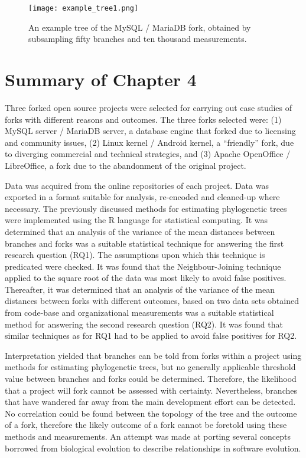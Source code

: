 \begin{figure}[H]
  \texttt{[image: example\_tree1.png]}
  \caption{An example tree of the MySQL / MariaDB fork, obtained by subsampling fifty branches and ten thousand measurements.}
  \label{fig:example_tree1}
\end{figure}


\section{Summary of Chapter 4}
Three forked open source projects were selected for carrying out case studies of forks with different reasons and outcomes. The three forks selected were: (1) MySQL server / MariaDB server, a database engine that forked due to licensing and community issues, (2) Linux kernel / Android kernel, a “friendly” fork, due to diverging commercial and technical strategies, and (3) Apache OpenOffice / LibreOffice, a fork due to the abandonment of the original project. 

Data was acquired from the online repositories of each project. Data was exported in a format suitable for analysis, re-encoded and cleaned-up where necessary. The previously discussed methods for estimating phylogenetic trees were implemented using the R language for statistical computing. It was determined that an analysis of the variance of the mean distances between branches and forks was a suitable statistical technique for answering the first research question (RQ1). The assumptions upon which this technique is predicated were checked. It was found that the Neighbour-Joining technique applied to the square root of the data was most likely to avoid false positives. Thereafter, it was determined that an analysis of the variance of the mean distances between forks with different outcomes, based on two data sets obtained from code-base and organizational measurements was a suitable statistical method for answering the second research question (RQ2). It was found that similar techniques as for RQ1 had to be applied to avoid false positives for RQ2. 

Interpretation yielded that branches can be told from forks within a project using methods for estimating phylogenetic trees, but no generally applicable threshold value between branches and forks could be determined. Therefore, the likelihood that a project will fork cannot be assessed with certainty. Nevertheless, branches that have wandered far away from the main development effort can be detected. No correlation could be found between the topology of the tree and the outcome of a fork, therefore the likely outcome of a fork cannot be foretold using these methods and measurements. An attempt was made at porting several concepts borrowed from biological evolution to describe relationships in software evolution.
